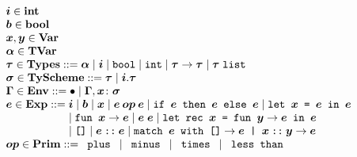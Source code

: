 \documentclass[11pt]{jarticle}
\begin{document}
\[\begin{array}{l}
\PolyTypingMLivMV{i}[] \in \mathbf{int}\\
\PolyTypingMLivMV{b}[] \in \mathbf{bool}\\
\PolyTypingMLivMV{x}[], \PolyTypingMLivMV{y}[] \in
\mathbf{Var}\\
\PolyTypingMLivMV{a}[] \in \mathbf{TVar}\\
\PolyTypingMLivMV{t}[] \in \mathbf{Types} ::=
\PolyTypingMLivTyFVarTerm{\PolyTypingMLivMV{a}[]}
\mid \PolyTypingMLivTyBVarTerm{\PolyTypingMLivMV{i}[]}
\mid \PolyTypingMLivTyBoolTerm \mid \PolyTypingMLivTyIntTerm
\mid \PolyTypingMLivTyFunTerm{\PolyTypingMLivMV{t}[]}{\PolyTypingMLivMV{t}[]}
\mid \PolyTypingMLivTyListTerm{\PolyTypingMLivMV{t}[]}\\
\PolyTypingMLivMV{s}[] \in \mathbf{TyScheme} ::= \PolyTypingMLivMV{t}[]
\mid \PolyTypingMLivTySchemeTerm{\PolyTypingMLivMV{i}[]}
{\PolyTypingMLivMV{t}[]}\\
\PolyTypingMLivMV{env}[] \in \mathbf{Env} ::= \PolyTypingMLivEmptyTerm
\mid \PolyTypingMLivBindTerm{\PolyTypingMLivMV{env}[]}
{\PolyTypingMLivMV{x}[]}{\PolyTypingMLivMV{s}[]}\\
\PolyTypingMLivMV{e}[] \in \mathbf{Exp} ::= \PolyTypingMLivMV{i}[]
\mid \PolyTypingMLivMV{b}[] \mid \PolyTypingMLivMV{x}[]
\mid \PolyTypingMLivBinOpTerm{\PolyTypingMLivMV{op}[]}
{\PolyTypingMLivMV{e}[]}{\PolyTypingMLivMV{e}[]}
\mid \PolyTypingMLivIfTerm{\PolyTypingMLivMV{e}[]}{\PolyTypingMLivMV{e}[]}
{\PolyTypingMLivMV{e}[]} \mid \PolyTypingMLivLetTerm{\PolyTypingMLivMV{x}[]}
{\PolyTypingMLivMV{e}[]}{\PolyTypingMLivMV{e}[]}
 \\ \hspace*{2.0cm}
\mid \PolyTypingMLivAbsTerm{\PolyTypingMLivMV{x}[]}{\PolyTypingMLivMV{e}[]}
\mid \PolyTypingMLivAppTerm{\PolyTypingMLivMV{e}[]}{\PolyTypingMLivMV{e}[]}
\mid \PolyTypingMLivLetRecTerm{\PolyTypingMLivMV{x}[]}
{\PolyTypingMLivMV{y}[]}{\PolyTypingMLivMV{e}[]}{\PolyTypingMLivMV{e}[]}
 \\ \hspace*{2.0cm}
\mid \PolyTypingMLivNilTerm
\mid \PolyTypingMLivConsTerm{\PolyTypingMLivMV{e}[]}{\PolyTypingMLivMV{e}[]}
\mid \PolyTypingMLivMatchTerm{\PolyTypingMLivMV{e}[]}{\PolyTypingMLivMV{e}[]}
{\PolyTypingMLivMV{x}[]}{\PolyTypingMLivMV{y}[]}
{\PolyTypingMLivMV{e}[]}\\
\PolyTypingMLivMV{op}[] \in \mathbf{Prim} ::= \PolyTypingMLivPlusTerm
\mid \PolyTypingMLivMinusTerm \mid \PolyTypingMLivMultTerm
\mid \PolyTypingMLivLtTerm\\
\end{array}\]
\end{document}
